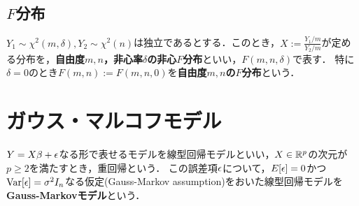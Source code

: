 \documentclass[uplatex,dvipdfmx]{jsreport}
\begin{document}
\begin{proposition}[確率密度関数]
    
\end{proposition}

\subsection{$F$分布}

\begin{definition}
    $Y_1\sim\chi^2(m,\delta),Y_2\sim\chi^2(n)$は独立であるとする．このとき，$X:=\frac{Y_1/m}{Y_2/m}$が定める分布を，\textbf{自由度$m,n$，非心率$\delta$の非心$F$分布}といい，$F(m,n,\delta)$で表す．
    特に$\delta=0$のとき$F(m,n):=F(m,n,0)$を\textbf{自由度$m,n$の$F$分布}という．
\end{definition}

\begin{proposition}[確率密度関数]
    
\end{proposition}

\section{ガウス・マルコフモデル}

\begin{tcolorbox}[colframe=ForestGreen, colback=ForestGreen!10!white,breakable,colbacktitle=ForestGreen!40!white,coltitle=black,fonttitle=\bfseries\sffamily,
title=]
    $Y=X\beta+\epsilon$なる形で表せるモデルを線型回帰モデルといい，$X\in\mathbb{R}^p$の次元が$p\ge2$を満たすとき，重回帰という．
    この誤差項$\epsilon$について，$E[\epsilon]=0$かつ$\mathrm{Var}[\epsilon]=\sigma^2I_n$なる仮定(Gauss-Markov assumption)をおいた線型回帰モデルを\textbf{Gauss-Markovモデル}という．
\end{tcolorbox}
\end{document}
